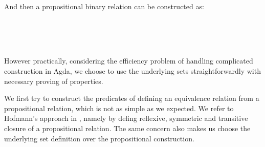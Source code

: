 And then a propositional binary relation can be constructed as:

\begin{code}
\\
\> \<[10]%
\>[10]\AgdaSymbol{:} \AgdaSymbol{\{} \AgdaSymbol{:} \AgdaSymbol{\}(} \AgdaSymbol{:}  \AgdaSymbol{)}   \<%
\\
\>  \AgdaSymbol{=}      \AgdaFunction{[}     \AgdaSymbol{)}     \AgdaSymbol{)} \AgdaFunction{]T}\<%
\\
\end{code}

However practically, considering the efficiency problem of handling complicated construction in Agda, we choose to use the underlying sets straightforwardly with necessary proving of properties.


We first try to construct the predicates of defining an equivalence relation from a propositional relation, which is not as simple as we expected. We refer to Hofmann's approach in \cite{hof:95:sm}, namely by defing reflexive, symmetric and transitive closure of a propositional relation. The same concern also makes us choose the underlying set definition over the propositional construction.

